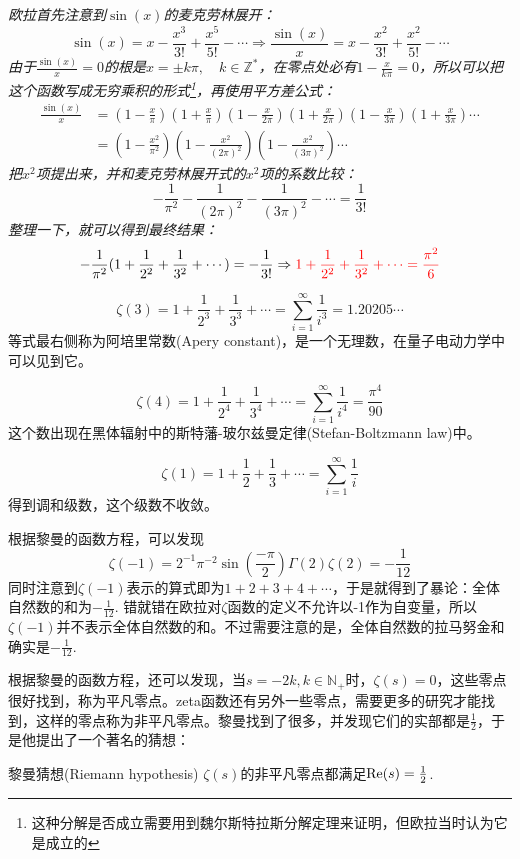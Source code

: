 \documentclass[main.tex]{subfiles}
\begin{document}
\textit{
欧拉首先注意到\(\sin(x)\)的麦克劳林展开：
\[ \sin(x) = x-\frac{x^3}{3!}+\frac{x^5}{5!} - \cdots \Rightarrow \frac{\sin(x)}{x} = x-\frac{x^2}{3!}+\frac{x^2}{5!} - \cdots\]
由于\(\displaystyle{\frac{\sin(x)}{x}}=0\)的根是\(x=\pm k\pi, \quad k\in \mathbb{Z}^*\)，在零点处必有\(\displaystyle{1-\frac{x}{k\pi}=0}\)，所以可以把这个函数写成无穷乘积的形式\footnote{这种分解是否成立需要用到魏尔斯特拉斯分解定理来证明，但欧拉当时认为它是成立的}，再使用平方差公式：
\begin{align*}
    \frac{\sin(x)}{x} &= \left(1-\frac{x}{\pi}\right)\left(1+\frac{x}{\pi}\right)\left(1-\frac{x}{2\pi}\right) \left(1+\frac{x}{2\pi}\right)\left(1-\frac{x}{3\pi}\right)\left(1+\frac{x}{3\pi}\right)\cdots \\
    & = \left(1-\frac{x^2}{\pi^2}\right) \left(1-\frac{x^2}{(2\pi)^2}\right) \left(1-\frac{x^2}{(3\pi)^2}\right)\cdots
\end{align*}
把\(x^2\)项提出来，并和麦克劳林展开式的\(x^2\)项的系数比较：
\[ -\frac{1}{\pi^2}-\frac{1}{(2\pi)^2}-\frac{1}{(3\pi)^2} -\cdots = \frac{1}{3!} \]
整理一下，就可以得到最终结果：
\[ -\frac{1}{\pi^2}(1+\frac{1}{2^2}+\frac{1}{3^2}+\cdots) = -\frac{1}{3!} \Rightarrow {\color{red} 1+\frac{1}{2^2}+\frac{1}{3^2}+\cdots = \frac{\pi^2}{6}}\]
}

\[\zeta(3) = 1+\frac{1}{2^3}+\frac{1}{3^3}+\cdots = \sum_{i=1}^{\infty} \frac{1}{i^3} = 1.20205\cdots\]
等式最右侧称为阿培里常数(Apery constant)，是一个无理数，在量子电动力学中可以见到它。

\[\zeta(4) = 1+\frac{1}{2^4}+\frac{1}{3^4}+\cdots = \sum_{i=1}^{\infty} \frac{1}{i^4} = \frac{\pi^4}{90}\]
这个数出现在黑体辐射中的斯特藩-玻尔兹曼定律(Stefan-Boltzmann law)中。

\[\zeta(1) = 1+\frac{1}{2}+\frac{1}{3}+\cdots = \sum_{i=1}^{\infty} \frac{1}{i}\]
得到调和级数，这个级数不收敛。

根据黎曼的函数方程，可以发现
\[ \zeta(-1) = 2^{-1} \pi^{-2} \sin\left(\frac{-\pi}{2}\right)\Gamma(2)\zeta(2) = -\frac{1}{12} \]
同时注意到\(\zeta(-1)\)表示的算式即为\(1+2+3+4+\cdots\)，于是就得到了暴论：全体自然数的和为\(-\frac{1}{12}\). 错就错在欧拉对\(\zeta\)函数的定义不允许以-1作为自变量，所以\(\zeta(-1)\)并不表示全体自然数的和。不过需要注意的是，全体自然数的拉马努金和确实是\(-\frac{1}{12}\).

根据黎曼的函数方程，还可以发现，当\(s=-2k, k\in\mathbb{N}_+\)时，\(\zeta(s)=0\)，这些零点很好找到，称为平凡零点。zeta函数还有另外一些零点，需要更多的研究才能找到，这样的零点称为非平凡零点。黎曼找到了很多，并发现它们的实部都是\(\frac{1}{2}\)，于是他提出了一个著名的猜想：
\begin{proposition}{黎曼猜想(Riemann hypothesis)}
    \(\zeta(s)\)的非平凡零点都满足\({\rm Re}(s)=\frac{1}{2}\).
\end{proposition}
\end{document}
